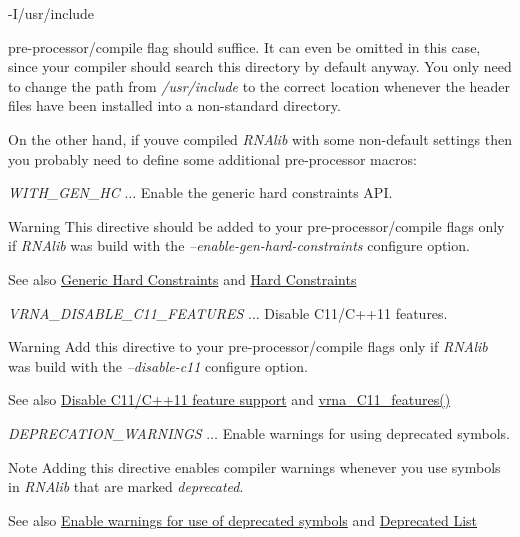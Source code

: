 \begin{DoxyVerb}-I/usr/include
\end{DoxyVerb}


pre-\/processor/compile flag should suffice. It can even be omitted in this case, since your compiler should search this directory by default anyway. You only need to change the path from {\itshape /usr/include} to the correct location whenever the header files have been installed into a non-\/standard directory.

On the other hand, if you\textquotesingle{}ve compiled {\itshape R\+N\+Alib} with some non-\/default settings then you probably need to define some additional pre-\/processor macros\+:


\begin{DoxyItemize}
\item {\itshape W\+I\+T\+H\+\_\+\+G\+E\+N\+\_\+\+HC} $\ldots$ Enable the generic hard constraints A\+PI. \begin{DoxyWarning}{Warning}
This directive should be added to your pre-\/processor/compile flags only if {\itshape R\+N\+Alib} was build with the {\itshape --enable-\/gen-\/hard-\/constraints} configure option. 
\end{DoxyWarning}
\begin{DoxySeeAlso}{See also}
\hyperlink{install_config_generic_hc}{Generic Hard Constraints} and \hyperlink{group__hard__constraints}{Hard Constraints}
\end{DoxySeeAlso}

\item {\itshape V\+R\+N\+A\+\_\+\+D\+I\+S\+A\+B\+L\+E\+\_\+\+C11\+\_\+\+F\+E\+A\+T\+U\+R\+ES} $\ldots$ Disable C11/\+C++11 features. \begin{DoxyWarning}{Warning}
Add this directive to your pre-\/processor/compile flags only if {\itshape R\+N\+Alib} was build with the {\itshape --disable-\/c11} configure option. 
\end{DoxyWarning}
\begin{DoxySeeAlso}{See also}
\hyperlink{install_config_c11}{Disable C11/\+C++11 feature support} and \hyperlink{group__data__structures_ga21744ae2d6a17309f9327d3547cef0cb}{vrna\+\_\+\+C11\+\_\+features()}
\end{DoxySeeAlso}

\item {\itshape D\+E\+P\+R\+E\+C\+A\+T\+I\+O\+N\+\_\+\+W\+A\+R\+N\+I\+N\+GS} $\ldots$ Enable warnings for using deprecated symbols. \begin{DoxyNote}{Note}
Adding this directive enables compiler warnings whenever you use symbols in {\itshape R\+N\+Alib} that are marked {\itshape deprecated}. 
\end{DoxyNote}
\begin{DoxySeeAlso}{See also}
\hyperlink{install_config_deprecated}{Enable warnings for use of deprecated symbols} and \hyperlink{deprecated}{Deprecated List}
\end{DoxySeeAlso}


\end{DoxyItemize}
